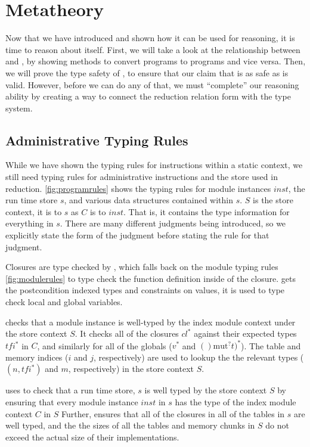 \chapter{Metatheory}
\label{chp:metatheory}

Now that we have introduced \name and shown how it can be used for reasoning, it is time to reason about \name itself.
First, we will take a look at the relationship between \wasm and \name, by showing methods to convert \wasm programs to \name programs and vice versa.
Then, we will prove the type safety of \name, to ensure that our claim that \name is as safe as \wasm is valid.
However, before we can do any of that, we must ``complete'' our reasoning ability by creating a way to connect the reduction relation form with the type system.

\section{Administrative Typing Rules}
While we have shown the \name typing rules for instructions within a static context, we still need typing rules for administrative instructions and the store used in reduction.
\autoref{fig:programrules} shows the \name typing rules for module instances $inst$, the run time store $s$, and various data structures contained within $s$.
$S$ is the store context, it is to $s$ as $C$ is to $inst$.
That is, it contains the type information for everything in $s$.
There are many different judgments being introduced, so we explicitly state the form of the judgment before stating the rule for that judgment.

Closures are type checked by , which falls back on the module typing rules \autoref{fig:modulerules} to type check the function definition inside of the closure.
 gets the postcondition indexed types and constraints on values, it is used to type check local and global variables.

 checks that a module instance is well-typed by the index module context under the store context $S$.
It checks all of the closures $cl^{*}$ against their expected types $tfi^{*}$ in $C$, and similarly for all of the globals ($v^{*}$ and $()\text{mut}^{?} t)^{*}$).
The table and memory indices ($i$ and $j$, respectively) are used to lookup the the relevant types ($(n,tfi^{*})$ and $m$, respectively) in the store context $S$.

 uses  to check that a run time store, $s$ is well typed by the store context $S$ by ensuring that every module instance $inst$ in $s$ has the type of the index module context $C$ in $S$
Further,  ensures that all of the closures in all of the tables in $s$ are well typed, and the the sizes of all the tables and memory chunks in $S$ do not exceed the actual size of their implementations.


